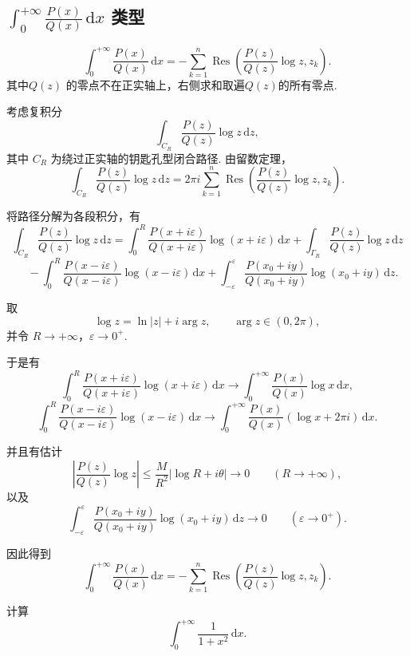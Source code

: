 \documentclass[openany,oneside]{ctexbook}
\begin{document}
\subsection{$
\int_{0}^{+\infty}\frac{P(x)}{Q(x)}\,\mathrm{d}x
$ 类型}
\begin{proposition}
\[
\int_0^{+\infty} \frac{P(x)}{Q(x)}\,\mathrm{d}x
=
- \sum_{k=1}^n
\operatorname{Res}\!\left(
\frac{P(z)}{Q(z)} \log z , z_k
\right).
\]
其中$Q(z)$ 的零点不在正实轴上，右侧求和取遍$Q(z)$的所有零点.
\end{proposition}
考虑复积分
\[
\int_{C_R} \frac{P(z)}{Q(z)} \log z \, \mathrm{d}z,
\]
其中 $C_R$ 为绕过正实轴的钥匙孔型闭合路径.
由留数定理，
\[
\int_{C_R} \frac{P(z)}{Q(z)} \log z \, \mathrm{d}z
= 2\pi i \sum_{k=1}^n
\operatorname{Res}\!\left( \frac{P(z)}{Q(z)} \log z , z_k \right).
\]

将路径分解为各段积分，有
\[
\int_{C_R} \frac{P(z)}{Q(z)} \log z \, \mathrm{d}z
=
\int_0^R \frac{P(x+i\varepsilon)}{Q(x+i\varepsilon)} \log(x+i\varepsilon)\,\mathrm{d}x
+ \int_{\Gamma_R} \frac{P(z)}{Q(z)} \log z\,\mathrm{d}z
\]
\[
\quad
- \int_0^R \frac{P(x-i\varepsilon)}{Q(x-i\varepsilon)} \log(x-i\varepsilon)\,\mathrm{d}x
+ \int_{-\varepsilon}^{\varepsilon}
\frac{P(x_0+i y)}{Q(x_0+i y)} \log(x_0+i y)\,\mathrm{d}z .
\]

取
\[
\log z = \ln|z| + i\arg z, \qquad \arg z \in (0,2\pi),
\]
并令 $R\to +\infty$，$\varepsilon\to 0^+$.

于是有
\[
\int_0^R \frac{P(x+i\varepsilon)}{Q(x+i\varepsilon)} \log(x+i\varepsilon)\,\mathrm{d}x
\longrightarrow
\int_0^{+\infty} \frac{P(x)}{Q(x)} \log x\,\mathrm{d}x,
\]
\[
\int_0^R \frac{P(x-i\varepsilon)}{Q(x-i\varepsilon)} \log(x-i\varepsilon)\,\mathrm{d}x
\longrightarrow
\int_0^{+\infty} \frac{P(x)}{Q(x)} (\log x + 2\pi i)\,\mathrm{d}x.
\]

并且有估计
\[
\left| \frac{P(z)}{Q(z)} \log z \right|
\le \frac{M}{R^2} |\log R + i\theta|
\longrightarrow 0
\qquad (R\to +\infty),
\]
以及
\[
\int_{-\varepsilon}^{\varepsilon}
\frac{P(x_0+i y)}{Q(x_0+i y)} \log(x_0+i y)\,\mathrm{d}z
\longrightarrow 0
\qquad (\varepsilon\to 0^+).
\]

因此得到
\[
\int_0^{+\infty} \frac{P(x)}{Q(x)}\,\mathrm{d}x
=
- \sum_{k=1}^n
\operatorname{Res}\!\left(
\frac{P(z)}{Q(z)} \log z , z_k
\right).
\]
\begin{example}
  计算
\[
\int_{0}^{+\infty} \frac{1}{1+x^2}\,\mathrm{d}x .
\]
\end{example}
\end{document}
